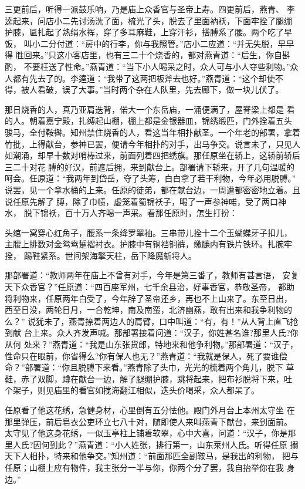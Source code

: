 三更前后，听得一派鼓乐响，乃是庙上众香官与圣帝上寿。四更前后，燕青、
李逵起来，问店小二先讨汤洗了面，梳光了头，脱去了里面衲袄，下面牢拴了腿绷
护膝，匾扎起了熟绢水裈，穿了多耳麻鞋，上穿汗衫，搭膊系了腰。两个吃了早饭，
叫小二分付道：“房中的行李，你与我照管。”店小二应道：“并无失脱，早早得
胜回来。”只这小客店里，也有三二十个烧香的，都对燕青道：“后生，你自斟酌，
不要枉送了性命。”燕青道：“当下小人喝采之时，众人可与小人夺些利物。”众
人都有先去了的。李逵道：“我带了这两把板斧去也好。”燕青道：“这个却使不
得，被人看破，误了大事。”当时两个杂在人队里，先去廊下，做一块儿伏了。

那日烧香的人，真乃亚肩迭背，偌大一个东岳庙，一涌便满了，屋脊梁上都是
看的人。朝着嘉宁殿，扎缚起山棚，棚上都是金银器皿，锦绣缎匹，门外拴着五头
骏马，全付鞍辔。知州禁住烧香的人，看这当年相扑献圣。一个年老的部署，拿着
竹批，上得献台，参神已罢，便请今年相扑的对手，出马争交。说言未了，只见人
如潮涌，却早十数对哨棒过来，前面列着四把绣旗。那任原坐在轿上，这轿前轿后
三二十对花膊的好汉，前遮后拥，来到献台上。部署请下轿来，开了几句温暖的
呵会。任原道：“我两年到岱岳，夺了头筹，白白拿了若干利物，今年必用脱膊。”
说罢，见一个拿水桶的上来。任原的徒弟，都在献台边，一周遭都密密地立着。且
说任原先解了膊，除了巾帻，虚笼着蜀锦袄子，喝了一声参神喏，受了两口神水，
脱下锦袄，百十万人齐喝一声采。看那任原时，怎生打扮：

头绾一窝穿心红角子，腰系一条绛罗翠袖。三串带儿拴十二个玉蝴蝶牙子扣儿，
主腰上排数对金鸳鸯踅褶衬衣。护膝中有铜裆铜裤，缴臁内有铁片铁环。扎腕牢拴，
踢鞋紧系。世间架海擎天柱，岳下降魔斩将人。

那部署道：“教师两年在庙上不曾有对手，今年是第三番了，教师有甚言语，
安复天下众香官？”任原道：“四百座军州，七千余县治，好事香官，恭敬圣帝，
都助将利物来，任原两年白受了，今年辞了圣帝还乡，再也不上山来了。东至日出，
西至日没，两轮日月，一合乾坤，南及南蛮，北济幽燕，敢有出来和我争利物的么？”
说犹未了，燕青捺着两边人的肩臂，口中叫道：“有，有！”从人背上直飞抢到献
台上来。众人齐发声喊。那部署接着问道：“汉子，你姓甚名谁?那里人氏?你从何
处来？”燕青道：“我是山东张货郎，特地来和他争利物。”那部署道：“汉子，
性命只在眼前，你省得么?你有保人也无？”燕青道：“我就是保人，死了要谁偿
命？”部署道：“你且脱膊下来看。”燕青除了头巾，光光的梳着两个角儿，脱下
草鞋，赤了双脚，蹲在献台一边，解了腿绷护膝，跳将起来，把布衫脱将下来，吐
个架子，则见庙里的看官如搅海翻江相似，迭头价喝采，众人都呆了。

任原看了他这花绣，急健身材，心里倒有五分怯他。殿门外月台上本州太守坐
在那里弹压，前后皂衣公吏环立七八十对，随即使人来叫燕青下献台，来到面前。
太守见了他这身花绣，一似玉亭柱上铺着软翠，心中大喜，问道：“汉子，你是那
里人氏?因何到此？”燕青道：“小人姓张，排行第一，山东莱州人氏。听得任原
搦天下人相扑，特来和他争交。”知州道：“前面那匹全副鞍马，是我出的利物，
把与任原；山棚上应有物件，我主张分一半与你，你两个分了罢，我自抬举你在我
身边。”

